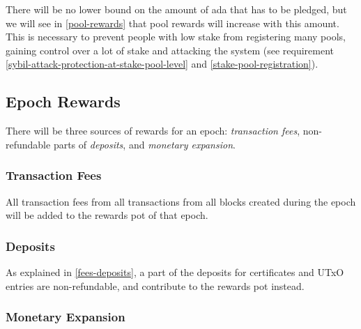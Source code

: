 \documentclass[11pt,a4paper,dvipsnames,twosided]{article}
\begin{document}
There will be no lower bound on the amount of ada that has to be
pledged, but we will see in \cref{pool-rewards} that pool
rewards will increase with this amount. This is necessary to prevent
people with low stake from registering many pools, gaining control over
a lot of stake and attacking the system (see requirement
\ref{sybil-attack-protection-at-stake-pool-level} and \cref{stake-pool-registration}).

\subsection{Epoch Rewards}
\label{epoch-rewards}

There will be three sources of rewards for an epoch: \emph{transaction
  fees}, non-refundable parts of \emph{deposits}, and \emph{monetary
  expansion}.

\subsubsection{Transaction Fees}
\label{transaction-fees-1}

All transaction fees from all transactions from all blocks created
during the epoch will be added to the rewards pot of that epoch.

\subsubsection{Deposits}
\label{deposits-1}

As explained in \cref{fees-deposits}, a part of the deposits for
certificates and UTxO entries are non-refundable, and contribute to
the rewards pot instead.

\subsubsection{Monetary Expansion}
\label{monetary-expansion}
\end{document}
